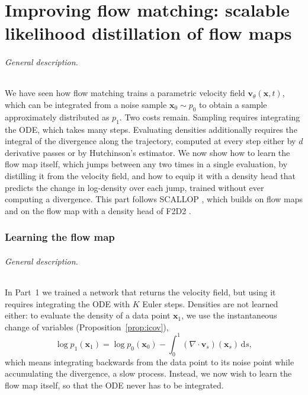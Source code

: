 \documentclass[11pt,a4paper]{article}
\numberwithin{equation}{section}     %
\theoremstyle{plain}        %
\theoremstyle{definition}   %
\theoremstyle{remark}       %
\begin{document}
\newpage

\part{Improving flow matching: scalable likelihood distillation of flow maps}\label{part:two}

\paragraph{General description.} We have seen how flow matching trains a parametric velocity field $\mathbf{v}_\theta(\mathbf{x},t)$, which can be integrated from a noise sample $\mathbf{x}_0\sim p_0$ to obtain a sample approximately distributed as $p_1$. Two costs remain. Sampling requires integrating the ODE, which takes many steps. Evaluating densities additionally requires the integral of the divergence along the trajectory, computed at every step either by $d$ derivative passes or by Hutchinson's estimator. We now show how to learn the flow map itself, which jumps between any two times in a single evaluation, by distilling it from the velocity field, and how to equip it with a density head that predicts the change in log-density over each jump, trained without ever computing a divergence. This part follows SCALLOP \citep{ouyang2026}, which builds on flow maps \citep{boffi2024flowmap,boffi2025build} and on the flow map with a density head of F2D2 \citep{ai2026}.

\section{Learning the flow map}\label{sec:flowmap2}

\paragraph{General description.} In Part~1 we trained a network that returns the velocity field, but using it requires integrating the ODE with $K$ Euler steps. Densities are not learned either: to evaluate the density of a data point $\mathbf{x}_1$, we use the instantaneous change of variables (Proposition~\ref{prop:icov}),
\[
\log p_1(\mathbf{x}_1)=\log p_0(\mathbf{x}_0)-\int_0^1\left(\nabla\cdot\mathbf{v}_s\right)(\mathbf{x}_s)\,\mathrm{d}s,
\]
which means integrating backwards from the data point to its noise point while accumulating the divergence, a slow process. Instead, we now wish to learn the flow map itself, so that the ODE never has to be integrated.
\end{document}
